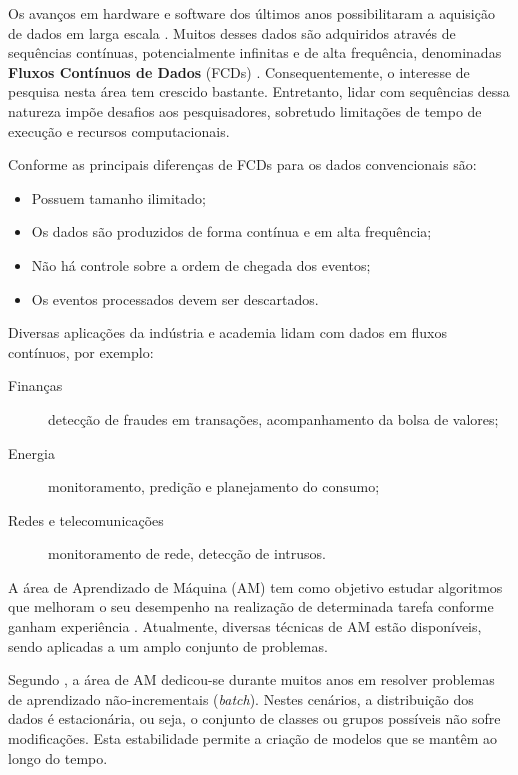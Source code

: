 \documentclass[qual, classic, a4paper]{ufbathesis}
\begin{document}
Os avanços em hardware e software dos últimos anos possibilitaram a aquisição de dados em larga escala \cite{Aggarwal:2003:FCE:1315451.1315460}.
Muitos desses dados são adquiridos através de sequências contínuas, potencialmente infinitas e de alta frequência, 
denominadas \textbf{Fluxos Contínuos de Dados} (FCDs) \cite{Aggarwal:2003:FCE:1315451.1315460, Gama:2010:KDD:1855075, GamaMCR04}.
Consequentemente, o interesse de pesquisa nesta área tem crescido bastante.
Entretanto, lidar com sequências dessa natureza impõe desafios aos pesquisadores, sobretudo limitações de tempo de execução e recursos computacionais.
 
Conforme \cite{Babcock:2002:MID:543613.543615} as principais diferenças de FCDs para os dados convencionais são:
\begin{itemize}
    \item Possuem tamanho ilimitado;
    \item Os dados são produzidos de forma contínua e em alta frequência;
    \item Não há controle sobre a ordem de chegada dos eventos;
    \item Os eventos processados devem ser descartados.
\end{itemize}

Diversas aplicações da indústria e academia lidam com dados em fluxos contínuos, por exemplo:

\begin{description}
    \item[Finanças] detecção de fraudes em transações, acompanhamento da bolsa de valores;
    \item[Energia] monitoramento, predição e planejamento do consumo;
    \item[Redes e telecomunicações] monitoramento de rede, detecção de intrusos.
\end{description}

A área de Aprendizado de Máquina (AM) tem como objetivo estudar algoritmos que melhoram o seu desempenho na realização de determinada tarefa conforme ganham experiência \cite{Mitchell:1997:ML:541177}.
Atualmente, diversas técnicas de AM estão disponíveis, sendo aplicadas a um amplo conjunto de problemas.

Segundo \cite{Gama:2010:KDD:1855075}, a área de AM dedicou-se durante muitos anos em resolver problemas de aprendizado não-incrementais (\textit{batch}).
Nestes cenários, a distribuição dos dados é estacionária, ou seja, o conjunto de classes ou grupos possíveis não sofre modificações.
Esta estabilidade permite a criação de modelos que se mantêm ao longo do tempo.
\end{document}
